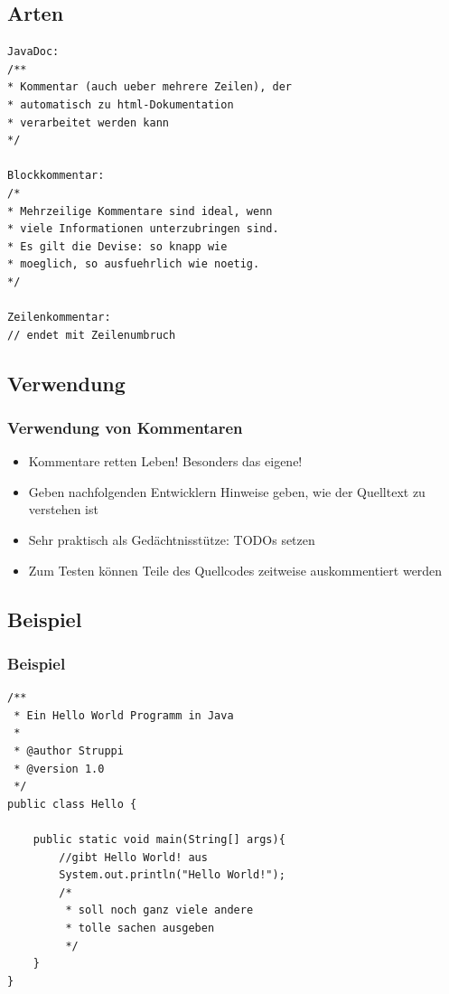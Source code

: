 \documentclass[final]{beamer}
\begin{document}
\subsection{Arten}
\begin{frame}[containsverbatim]
	\begin{lstlisting}
JavaDoc:
/**
* Kommentar (auch ueber mehrere Zeilen), der
* automatisch zu html-Dokumentation
* verarbeitet werden kann
*/

Blockkommentar:
/*
* Mehrzeilige Kommentare sind ideal, wenn
* viele Informationen unterzubringen sind.
* Es gilt die Devise: so knapp wie
* moeglich, so ausfuehrlich wie noetig.
*/

Zeilenkommentar:
// endet mit Zeilenumbruch
	\end{lstlisting}
\end{frame}

\subsection{Verwendung}
\begin{frame}
	\frametitle{Verwendung von Kommentaren}
	\begin{itemize}
		\item{Kommentare retten Leben! Besonders das eigene!}
		\item{Geben nachfolgenden Entwicklern Hinweise geben, wie der Quelltext zu verstehen ist}
		\item{Sehr praktisch als Gedächtnisstütze: TODOs setzen}
		\item{Zum Testen können Teile des Quellcodes zeitweise auskommentiert werden}
	\end{itemize}
\end{frame}

\subsection{Beispiel}
\begin{frame}[containsverbatim]
\frametitle{Beispiel}
	\begin{lstlisting}
/**
 * Ein Hello World Programm in Java
 * 
 * @author Struppi
 * @version 1.0
 */
public class Hello {

	public static void main(String[] args){
		//gibt Hello World! aus 
		System.out.println("Hello World!");
		/*
		 * soll noch ganz viele andere 
		 * tolle sachen ausgeben
		 */
	}
}

	\end{lstlisting}
	
\end{frame}
\end{document}
